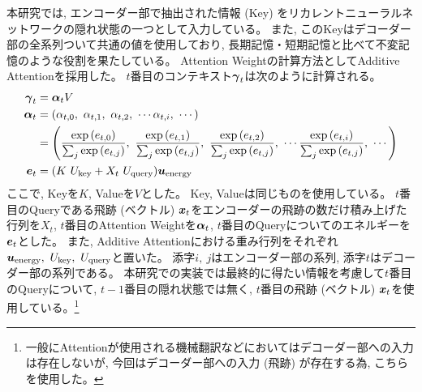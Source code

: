 本研究では, エンコーダー部で抽出された情報 (Key) をリカレントニューラルネットワークの隠れ状態の一つとして入力している。
また, このKeyはデコーダー部の全系列ついて共通の値を使用しており, 長期記憶・短期記憶と比べて不変記憶のような役割を果たしている。
Attention Weightの計算方法としてAdditive Attentionを採用した。
$t$番目のコンテキスト${\mbox{\boldmath{$\gamma$}}}_{t}$は次のように計算される。
\begin{equation}
 \begin{split}
  {\mbox{\boldmath{$\gamma$}}}_{t} 
  &= {\mbox{\boldmath{$\alpha$}}}_{t} V\\
  {\mbox{\boldmath{$\alpha$}}}_{t}
  &= (\alpha_{t,0},\ \alpha_{t,1},\ \alpha_{t,2},\ \cdots \alpha_{t,i},\ \cdots) \\
  &= \left(\frac{\exp{({{e}}_{t,0})}}{\sum_j \exp{({{e}}_{t,j})}},\ \frac{\exp{({{e}}_{t,1})}}{\sum_j \exp{({{e}}_{t,j})}},\ \frac{\exp{({{e}}_{t,2})}}{\sum_j \exp{({{e}}_{t,j})}},\  \cdots \frac{\exp{({{e}}_{t,i})}}{\sum_j \exp{({{e}}_{t,j})}},\ \cdots\right)\\
  {\mbox{\boldmath{$e$}}}_{t}
  &=(K\ U_{\rm key} + X_t\ U_{\rm query}) {\mbox{\boldmath{$u$}}}_{\rm energy} \\
 \end{split}
\end{equation}
ここで, Keyを$K$, Valueを$V$とした。
 Key, Valueは同じものを使用している。
 $t$番目のQueryである飛跡 (ベクトル) ${\mbox{\boldmath{$x$}}}_{t}$をエンコーダーの飛跡の数だけ積み上げた行列を$X_t$, $t$番目のAttention Weightを${\mbox{\boldmath{$\alpha$}}}_{t}$, $t$番目のQueryについてのエネルギーを${\mbox{\boldmath{$e$}}}_{t}$とした。
また, Additive Attentionにおける重み行列をそれぞれ${\mbox{\boldmath{$u$}}}_{\rm energy},\  U_{\rm key},\ U_{\rm query}$と置いた。
添字$i,\ j$はエンコーダー部の系列, 添字$t$はデコーダー部の系列である。
本研究での実装では最終的に得たい情報を考慮して$t$番目のQueryについて, $t-1$番目の隠れ状態では無く, $t$番目の飛跡 (ベクトル) ${\mbox{\boldmath{$x$}}}_{t}$を使用している。\footnote{一般にAttentionが使用される機械翻訳などにおいてはデコーダー部への入力は存在しないが, 今回はデコーダー部への入力 (飛跡) が存在する為, こちらを使用した。}\\

